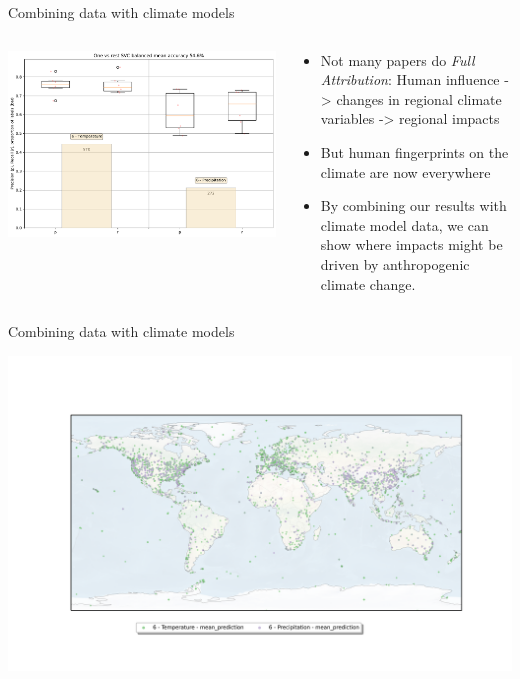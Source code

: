 \documentclass[9pt]{beamer}
\begin{document}
\begin{frame}{Combining data with climate models }

\begin{columns}
	\begin{column}{0.618\linewidth}
		\includegraphics[width=\linewidth]{../plots/prediction_models/drivers_tp.pdf}
	\end{column}
	\begin{column}{0.382\linewidth}
		\begin{itemize}
			\item Not many papers do \textit{Full Attribution}: Human influence -> changes in regional climate variables -> regional impacts
			\item But human fingerprints on the climate are now everywhere \citep{Sippel2020}
			\item By combining our results with climate model data, we can show where impacts might be driven by anthropogenic climate change. 
		\end{itemize}
	\end{column}
\end{columns}

\end{frame}

\begin{frame}{Combining data with climate models }

	\includegraphics[width=\linewidth]{../plots/maps/predicted_places_drirvers_attribution.png}

\end{frame}
\end{document}
